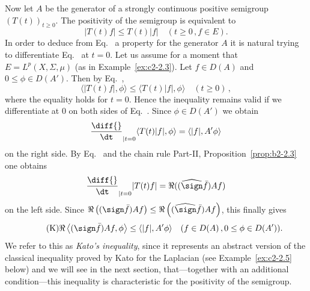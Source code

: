 Now let $A$ be the generator of a strongly continuous positive semigroup $(T(t))_{t \geq 0}$.
The positivity of the semigroup is equivalent to
\begin{equation}\label{eq:c2-2.7}
|T(t)f| \leq T(t)|f| \quad (t \geq 0 \,, f \in E).
\end{equation}
In order to deduce from Eq.~ a property for the generator $A$ it is natural trying to differentiate Eq.~ at $t = 0$.
Let us assume for a moment that $E = L^p(X,\Sigma,\mu)$ (as in Example~\ref{ex:c2-2.3}).
Let $f \in D(A)$ and $0 \leq \phi \in D(A')$.
Then by Eq.~,
\begin{equation}\label{eq:c2-2.8}
	\langle |T(t)f|,\phi \rangle \leq \langle T(t)|f|,\phi \rangle \quad (t \geq 0)\,,
\end{equation}
where the equality holds for $t = 0$.
Hence the inequality remains valid if we differentiate at $0$ on both sides of Eq.~.
Since $\phi \in D(A')$ we obtain
\[
\frac{\diff{}}{\dt}_{|t=0} \langle T(t)|f|,\phi \rangle = \langle |f|,A'\phi \rangle
\]
on the right side.
By Eq.~ and the chain rule Part-II, Proposition~\ref{prop:b2-2.3} 
one obtains 
\[
{\frac{\diff{}}{\dt}}_{|t=0} |T(t)f| = \Re((\widehat{\sign} \bar{f})Af)
\]
on the left side.
Since $\Re\left((\sign \bar{f})Af\right) \leq \Re\left((\widehat{\sign} \bar{f})Af\right)$, this finally gives
\begin{equation*}\label{eq:c2-K} \tag{K}
\Re\left\langle(\sign \bar{f})Af,\phi \right\rangle \leq \langle |f|,A'\phi \rangle \quad (f \in D(A) \,, 0 \leq \phi \in D(A')).
\end{equation*}
We refer to this as \emph{Kato's inequality}, since it represents an abstract version of the classical inequality proved by Kato for the Laplacian (see Example~\ref{ex:c2-2.5} below) and we will see in the next section, that---together with an additional condition---this inequality is characteristic for the positivity of the semigroup.

